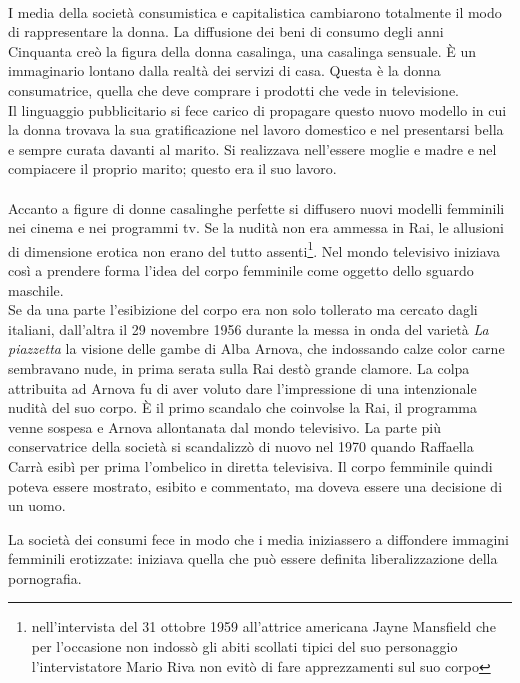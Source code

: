 \paragraph{}I media della società consumistica e capitalistica cambiarono totalmente il modo di rappresentare la donna.
La diffusione dei beni di consumo degli anni Cinquanta creò la figura della donna casalinga, una casalinga sensuale.
È un immaginario lontano dalla realtà dei servizi di casa.
Questa è la donna consumatrice, quella che deve comprare i prodotti che vede in televisione.
\\Il linguaggio pubblicitario si fece carico di propagare questo nuovo modello in cui la donna trovava la sua gratificazione nel lavoro domestico e nel presentarsi bella e sempre curata davanti al marito.
Si realizzava nell'essere moglie e madre e nel compiacere il proprio marito; questo era il suo lavoro.
 
\paragraph{}Accanto a figure di donne casalinghe perfette si diffusero nuovi modelli femminili nei cinema e nei programmi tv.
Se la nudità non era ammessa in Rai, le allusioni di dimensione erotica non erano  del tutto assenti\footnote{nell'intervista del 31 ottobre 1959 all'attrice americana Jayne Mansfield che per l'occasione non indossò gli abiti scollati tipici del suo personaggio l'intervistatore Mario Riva non evitò di fare apprezzamenti sul suo corpo}. 
Nel mondo televisivo iniziava così a prendere forma l'idea del corpo femminile come oggetto dello sguardo maschile.
\\Se da una parte l'esibizione del corpo era non solo tollerato ma cercato dagli italiani, dall'altra il 29 novembre 1956 durante la messa in onda del varietà \textit{La piazzetta} la visione delle gambe di Alba Arnova, che indossando calze color carne sembravano nude, in prima serata sulla Rai destò grande clamore.
La colpa attribuita ad Arnova fu di aver voluto dare l'impressione di una intenzionale nudità del suo corpo.
È il primo scandalo che coinvolse la Rai, il programma venne sospesa e Arnova allontanata dal mondo televisivo.
La parte più conservatrice della società si scandalizzò di nuovo nel 1970 quando Raffaella Carrà esibì per prima l'ombelico in diretta televisiva.
Il corpo femminile quindi poteva essere mostrato, esibito e commentato, ma doveva essere una decisione di un uomo.

La società dei consumi fece in modo che i media iniziassero a diffondere immagini femminili erotizzate: iniziava quella che può essere definita liberalizzazione della pornografia.

